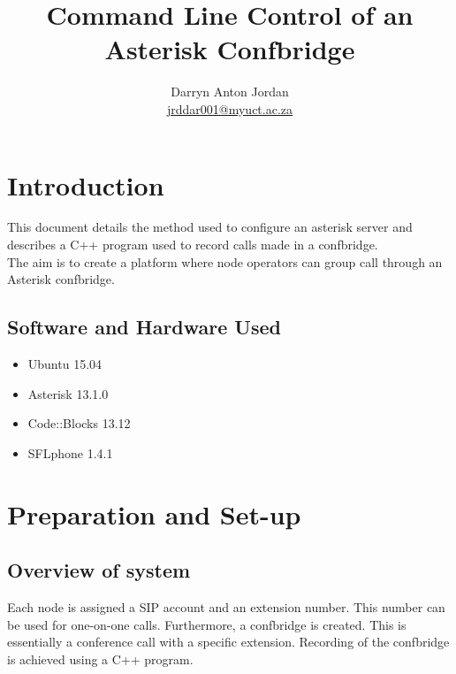 \documentclass[a4paper,11pt]{report}
\title{Command Line Control of an Asterisk Confbridge}
\author{Darryn Anton Jordan \\\href{mailto:jrddar001@myuct.ac.za}{jrddar001@myuct.ac.za}}
\begin{document}
\maketitle
\tableofcontents


\newpage

\section{Introduction}
This document details the method used to configure an asterisk server and describes a C++ program used to record calls made in a confbridge.\\ The aim is to create a platform where node operators can group call through an Asterisk confbridge. 

\subsection{Software and Hardware Used}
\begin{itemize}
  \item Ubuntu 15.04
  \item Asterisk 13.1.0
  \item Code::Blocks 13.12
  \item SFLphone 1.4.1
\end{itemize}

\newpage

\section{Preparation and Set-up}
\subsection{Overview of system}
Each node is assigned a SIP account and an extension number. This number can be used for one-on-one calls. Furthermore, a confbridge is created. This is essentially a conference call with a specific extension. Recording of the confbridge is achieved using a C++ program. 
\end{document}

